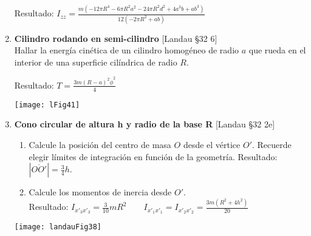 \documentclass[11pt, spanish, a4paper, twoside]{article}
\begin{document}
\begin{enumerate}
			Resultado: 
			\(
			I_{zz} = \frac{m \left(- 12 \pi R^{4} - 6 \pi R^{2} a^{2} - 24 \pi R^{2} d^{2} + 4 a^{3} b + a b^{3}\right)}{12 \left(- 2 \pi R^{2} + a b\right)}
			\) 


	\item 
		\begin{minipage}[t][2.5cm]{0.65\textwidth}
			\textbf{Cilindro rodando en semi-cilindro} [Landau \S 32 6]\\
			Hallar la energía cinética de un cilindro homogéneo de radio \(a\) que rueda en el interior de una superficie cilíndrica de radio \(R\).

			Resultado:
			\(
				T = \frac{3 m \left(R - a\right)^{2} \dot{\phi}^{2}}{4}
			\)
		\end{minipage}
		\begin{minipage}[c][1cm][t]{0.3\textwidth}
			\texttt{[image: lFig41]}
		\end{minipage}


	\item 
		\begin{minipage}[t][3.5cm]{0.75\textwidth}
			\textbf{Cono circular de altura h y radio de la base R} [Landau \S 32 2e]\begin{enumerate}
				\item Calcule la posición del centro de masa \(O\) desde el vértice \(O'\).
				Recuerde elegir límites de integración en función de la geometría.
				Resultado: \(|\overline{O O'}| = \frac{3}{4} h\).
				\item Calcule los momentos de inercia desde \(O'\).\\
				Resultado: \(I_{x'_3 x'_3} = \frac{3}{10} m R^{2} \qquad I_{x'_1 x'_1} = I_{x'_2 x'_2} = \frac{3 m \left(R^{2} + 4 h^{2}\right)}{20}\)
			\end{enumerate}
			\end{minipage}
			\begin{minipage}[c][1cm][t]{0.2\textwidth}
			\texttt{[image: landauFig38]}
		\end{minipage}



\end{enumerate}
\end{document}
